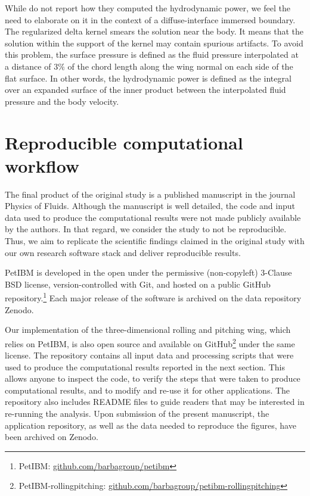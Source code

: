 While \citet{li_dong_2016} do not report how they computed the hydrodynamic power, we feel the need to elaborate on it in the context of a diffuse-interface immersed boundary.
The regularized delta kernel smears the solution near the body.
It means that the solution within the support of the kernel may contain spurious artifacts.
To avoid this problem, the surface pressure is defined as the fluid pressure interpolated at a distance of $3\%$ of the chord length along the wing normal on each side of the flat surface.
In other words, the hydrodynamic power is defined as the integral over an expanded surface of the inner product between the interpolated fluid pressure and the body velocity.

\section{Reproducible computational workflow}

The final product of the original study is a published manuscript in the journal Physics of Fluids.
Although the manuscript is well detailed, the code and input data used to produce the computational results were not made publicly available by the authors.
In that regard, we consider the study to not be reproducible.
Thus, we aim to replicate the scientific findings claimed in the original study with our own research software stack and deliver reproducible results.

PetIBM\supercite{chuang_et_al_2018} is developed in the open under the permissive (non-copyleft) 3-Clause BSD license, version-controlled with Git, and hosted on a public GitHub repository.\footnote{PetIBM: \url{github.com/barbagroup/petibm}}
Each major release of the software is archived on the data repository Zenodo.

Our implementation of the three-dimensional rolling and pitching wing, which relies on PetIBM, is also open source and available on GitHub\footnote{PetIBM-rollingpitching: \url{github.com/barbagroup/petibm-rollingpitching}} under the same license.
The repository contains all input data and processing scripts that were used to produce the computational results reported in the next section.
This allows anyone to inspect the code, to verify the steps that were taken to produce computational results, and to modify and re-use it for other applications.
The repository also includes \textsc{README} files to guide readers that may be interested in re-running the analysis.
Upon submission of the present manuscript, the application repository, as well as the data needed to reproduce the figures, have been archived on Zenodo.


